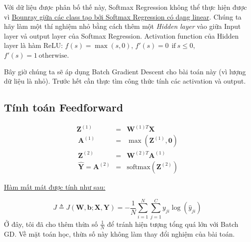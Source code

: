  
 
 
Với dữ liệu được phân bố thế này, Softmax Regression không thể thực hiện được vì \href{http://machinelearningcoban.com/2017/02/17/softmax/#-boundary-tao-boi-softmax-regression-la-linear}{Bounray giữa các class tạo bởi Softmax Regression có dạng linear}. Chúng ta hãy làm một thí nghiệm nhỏ bằng cách thêm một \textit{Hidden layer} vào giữa Input layer vả output layer của Softmax Regression. Activation function của Hidden layer là hàm ReLU: $f(s) = \max(s, 0)$, $f'(s) = 0 ~~\text{if}~ s \leq 0$, $f'(s) = 1 ~\text{otherwise}$. 
 
 
Bây giờ chúng ta sẽ áp dụng Batch Gradient Descent cho bài toán này (vì lượng dữ liệu là nhỏ). Trước hết cần thực tìm công thức tính các activation và output. 
 
\subsection{Tính toán Feedforward}
\begin{eqnarray} 
\mathbf{Z}^{(1)} &=& \mathbf{W}^{(1)T}\mathbf{X} \\\ 
\mathbf{A}^{(1)} &=& \max(\mathbf{Z}^{(1)}, \mathbf{0}) \\\ 
\mathbf{Z}^{(2)} &=& \mathbf{W}^{(2)T}\mathbf{A}^{(1)} \\\ 
\mathbf{\hat{Y}} = \mathbf{A}^{(2)} &=& \text{softmax}(\mathbf{Z}^{(2)}) 
\end{eqnarray} 
 
\href{http://machinelearningcoban.com/2017/02/17/softmax/#-ham-mat-mat-cho-softmax-regression}{Hàm mất mát được tính như sau:} 
 
\begin{equation*} 
J \triangleq J(\mathbf{W, b}; \mathbf{X, Y}) = -\frac{1}{N}\sum_{i = 1}^N \sum_{j = 1}^C y_{ji}\log(\hat{y}_{ji}) 
\end{equation*} 
Ở đây, tôi đã cho thêm thừa số $\frac{1}{N}$ để tránh hiện tượng tổng quá lớn với Batch GD. Về mặt toán học, thừa số này không làm thay đổi nghiệm của bài toán. 
 
